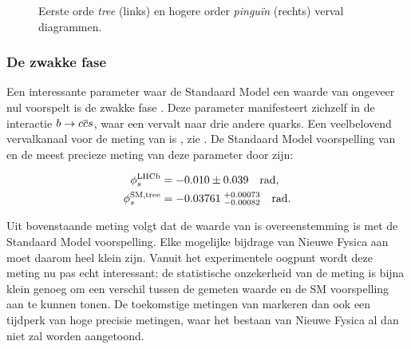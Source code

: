 \begin{figure}[t]
  \begin{subfigure}{0.5\textwidth}
    \raggedright
    {\scalebox{1}{\sffamily }}
    \caption{}
    \label{app_nl_jpsiphi_tree}
  \end{subfigure}%
  \hfill
  \begin{subfigure}{0.5\textwidth}
    \raggedleft
    {\scalebox{1}{\sffamily }}
    \caption{}
    \label{app_nl_jpsiphi_peng}
  \end{subfigure}
     \caption{Eerste orde {\it tree} (links) en hogere order {\it pingu\"in} (rechts) \BsJpsiPhi verval diagrammen.}
  \label{app_nl_jpsiphi_tree_peng}
\end{figure}

\subsubsection{De zwakke fase \phis}
Een interessante parameter waar de Standaard Model een waarde van ongeveer nul voorspelt is de zwakke fase \phis.
Deze parameter manifesteert zichzelf in de interactie $b\rightarrow c\overline {c}s$, waar een \bquark
vervalt naar drie andere quarks. Een veelbelovend vervalkanaal voor de meting van \phis is \BsJpsiPhi,
zie . De Standaard Model voorspelling van \phis en de meest precieze meting van deze
parameter door \lhcb zijn:

\begin{subequations}
  \label{app_nl_phis_lhcb_theo}
  \begin{align}
  \centering
  \phiS{\lhcb}           &=  -0.010 \pm 0.039  \quad {\rm rad},
  \label{app_nl_phis_lhcb}\\
  \phiS{SM,tree}  &= -0.03761 \; ^{+0.00073}_{-0.00082}  \quad {\rm rad}.
  \label{app_nl_phis_theo}
\end{align}
\end{subequations}


\noindent Uit bovenstaande meting volgt dat de waarde van \phis is overeenstemming is met de Standaard Model voorspelling.
Elke mogelijke bijdrage van Nieuwe Fysica aan \phis moet daarom heel klein zijn. Vanuit het experimentele oogpunt wordt
deze meting nu pas echt interessant: de statistische onzekerheid van de meting is bijna klein genoeg om een verschil tussen
de gemeten waarde en de SM voorspelling aan te kunnen tonen. De toekomstige metingen van \phis markeren dan ook een tijdperk
van hoge precisie metingen, waar het bestaan van Nieuwe Fysica al dan niet zal worden aangetoond.

